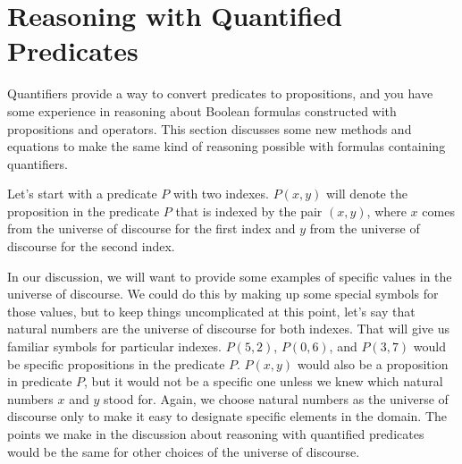 {{\begin{exercises}


\end{exercises}

\section{Reasoning with Quantified Predicates}
\label{sec:quantifier-equations}

Quantifiers provide a way to convert predicates to propositions,
and you have some experience in reasoning about Boolean formulas constructed with
propositions and operators.
This section discusses some new methods and equations to make
the same kind of reasoning possible with formulas containing quantifiers.

Let's start with a predicate $P$ with two indexes.
$P(x,y)$ will denote the proposition in the predicate $P$ that is indexed
by the pair $(x,y)$, where $x$ comes from the universe of discourse for the first index
and $y$ from the universe of discourse for the second index.

In our discussion, we will want to provide some examples
of specific values in the universe of discourse.
We could do this by making up some special symbols for those values,
but to keep things uncomplicated at this point,
let's say that natural numbers are the universe of discourse for both indexes.
That will give us familiar symbols for particular indexes.
$P(5,2)$, $P(0,6)$, and $P(3,7)$ would be specific propositions in the predicate $P$.
$P(x,y)$ would also be a proposition in predicate $P$, but it would not be a specific one
unless we knew which natural numbers $x$ and $y$ stood for.
Again, we choose natural numbers as the universe of discourse
only to make it easy to designate specific elements in the domain.
The points we make in the discussion about reasoning with quantified predicates
would be the same for other choices of the universe of discourse.

}}
